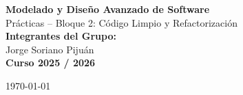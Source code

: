 \begin{titlepage}
    \centering
    \vspace*{2cm}
    
    {\Huge \textbf{Modelado y Diseño Avanzado de Software}}\\[1cm]
    {\LARGE Prácticas – Bloque 2: Código Limpio y Refactorización}\\[2cm]
    
    {\Large \textbf{Integrantes del Grupo:}}\\[0.5cm]
    Jorge Soriano Pijuán\\ [2cm]
    
    {\large \textbf{Curso 2025 / 2026}}\\[2cm]
    
    \vfill
    
    {\large \today}
\end{titlepage}
